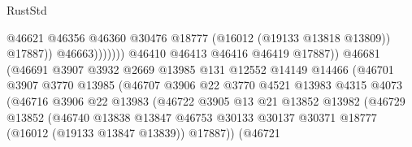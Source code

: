 \begin{lexlean}{RustStd}
\begin{coremodule}
                                                  @46621
                                                  @46356
                                                  @46360
                                                  @30476
                                                  @18777
                                                  (@16012 (@19133 @13818 @13809))
                                                  @17887))
                                              @46663)))))))
                                @46410
                                @46413
                                @46416
                                @46419
                                @17887))
                            @46681
                            (@46691
                              @3907
                              @3932
                              @2669
                              @13985
                              @131
                              @12552
                              @14149
                              @14466
                              (@46701
                                @3907
                                @3770
                                @13985
                                (@46707
                                  @3906
                                  @22
                                  @3770
                                  @4521
                                  @13983
                                  @4315
                                  @4073
                                  (@46716
                                    @3906
                                    @22
                                    @13983
                                    (@46722
                                      @3905
                                      @13
                                      @21
                                      @13852
                                      @13982
                                      (@46729
                                        @13852
                                        (@46740
                                          @13838
                                          @13847
                                          @46753
                                          @30133
                                          @30137
                                          @30371
                                          @18777
                                          (@16012 (@19133 @13847 @13839))
                                          @17887))
                                      (@46721

\end{coremodule}
\end{lexlean}
